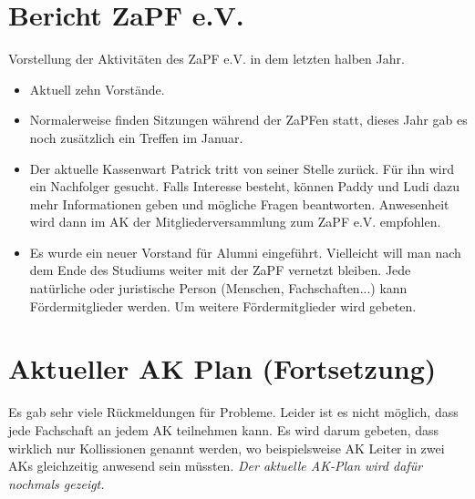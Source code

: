 \section{Bericht ZaPF e.V.}
  Vorstellung der Aktivitäten des ZaPF e.V. in dem letzten halben Jahr.
  \begin{itemize}
    \item Aktuell zehn Vorstände.
    \item Normalerweise finden Sitzungen während der ZaPFen statt, dieses Jahr gab es noch zusätzlich ein Treffen im Januar.
    \item Der aktuelle Kassenwart Patrick tritt von seiner Stelle zurück. Für ihn wird ein Nachfolger gesucht. Falls Interesse besteht, können Paddy und Ludi dazu mehr Informationen geben und mögliche Fragen beantworten. Anwesenheit wird dann im AK der Mitgliederversammlung zum ZaPF e.V. empfohlen.
    \item Es wurde ein neuer Vorstand für Alumni eingeführt. Vielleicht will man nach dem Ende des Studiums weiter mit der ZaPF vernetzt bleiben.
    Jede natürliche oder juristische Person (Menschen, Fachschaften...) kann Fördermitglieder werden. Um weitere Fördermitglieder wird gebeten.
  \end{itemize}

\section{Aktueller AK Plan (Fortsetzung)}
  Es gab sehr viele Rückmeldungen für Probleme.
  Leider ist es nicht möglich, dass jede Fachschaft an jedem AK teilnehmen kann. Es wird darum gebeten, dass wirklich nur Kollissionen genannt werden, wo beispielsweise AK Leiter in zwei AKs gleichzeitig anwesend sein müssten.
  \textit{Der aktuelle AK-Plan wird dafür nochmals gezeigt.}

